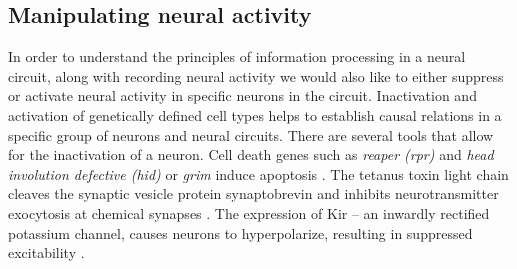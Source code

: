 
\subsection{Manipulating neural activity}

In order to understand the principles of information processing in a neural circuit, along with recording neural activity we would also like to either suppress or activate neural activity in specific neurons in the circuit. Inactivation and activation of genetically defined cell types helps to establish causal relations in a specific group of neurons and neural circuits. There are several tools that allow for the inactivation of a neuron. Cell death genes such as \textit{reaper (rpr)} and \textit{head involution defective (hid)} or \textit{grim} induce apoptosis \parencite{Chen1996, Grether1995}.  The tetanus toxin light chain cleaves the synaptic vesicle protein synaptobrevin and inhibits neurotransmitter exocytosis at chemical synapses \parencite{Sweeney1995}. The expression of Kir -- an inwardly rectified potassium channel, causes neurons to hyperpolarize, resulting in suppressed excitability \parencite{Johns1999}. %

